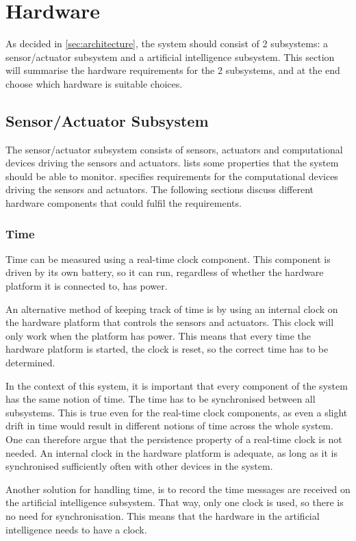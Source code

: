\section{Hardware}
As decided in \cref{sec:architecture}, the system should consist of 2 subsystems: a sensor/actuator subsystem and a artificial intelligence subsystem. This section will summarise the hardware requirements for the 2 subsystems, and at the end choose which hardware is suitable choices.

\subsection{Sensor/Actuator Subsystem}
The sensor/actuator subsystem consists of sensors, actuators and computational devices driving the sensors and actuators.  lists some properties that the system should be able to monitor.  specifies requirements for the computational devices driving the sensors and actuators. The following sections discuss different hardware components that could fulfil the requirements.

\subsubsection{Time}
Time can be measured using a real-time clock component. This component is driven by its own battery, so it can run, regardless of whether the hardware platform it is connected to, has power.

An alternative method of keeping track of time is by using an internal clock on the hardware platform that controls the sensors and actuators. This clock will only work when the platform has power. This means that every time the hardware platform is started, the clock is reset, so the correct time has to be determined.

In the context of this system, it is important that every component of the system has the same notion of time. The time has to be synchronised between all subsystems. This is true even for the real-time clock components, as even a slight drift in time would result in different notions of time across the whole system. One can therefore argue that the persistence property of a real-time clock is not needed. An internal clock in the hardware platform is adequate, as long as it is synchronised sufficiently often with other devices in the system.

Another solution for handling time, is to record the time messages are received on the artificial intelligence subsystem. That way, only one clock is used, so there is no need for synchronisation. This means that the hardware in the artificial intelligence needs to have a clock.

